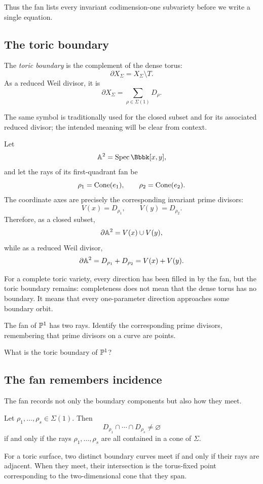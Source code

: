 Thus the fan lists every invariant codimension-one subvariety before
we write a single equation.

\subsection{The toric boundary}

\begin{definition}
The \emph{toric boundary} is the complement of the dense torus:
\[
\partial X_\Sigma
=
X_\Sigma\setminus T.
\]
As a reduced Weil divisor, it is
\[
\partial X_\Sigma
=
\sum_{\rho\in\Sigma(1)}D_\rho.
\]
\end{definition}

The same symbol is traditionally used for the closed subset and for
its associated reduced divisor; the intended meaning will be clear
from context.

\begin{example}
Let
\[
\AAA^2=\Spec\Bbbk[x,y],
\]
and let the rays of its first-quadrant fan be
\[
\rho_1=\operatorname{Cone}(e_1),
\qquad
\rho_2=\operatorname{Cone}(e_2).
\]
The coordinate axes are precisely the corresponding invariant prime
divisors:
\[
V(x)=D_{\rho_1},
\qquad
V(y)=D_{\rho_2}.
\]
Therefore, as a closed subset,
\[
\partial\mathbb{A}^2
=
V(x)\cup V(y),
\]
while as a reduced Weil divisor,
\[
\partial\mathbb{A}^2
=
D_{\rho_1}+D_{\rho_2}
=
V(x)+V(y).
\]
\end{example}

For a complete toric variety, every direction has been filled in by
the fan, but the toric boundary remains: completeness does not mean
that the dense torus has no boundary. It means that every
one-parameter direction approaches some boundary orbit.

\begin{pauseandthink}
The fan of \(\mathbb{P}^1\) has two rays. Identify the corresponding prime
divisors, remembering that prime divisors on a curve are points.

What is the toric boundary of \(\mathbb{P}^1\)?
\end{pauseandthink}

\subsection{The fan remembers incidence}

The fan records not only the boundary components but also how they
meet.

\begin{proposition}
\label{prop:boundary-incidence}
Let \(\rho_1,\ldots,\rho_s\in\Sigma(1)\). Then
\[
D_{\rho_1}\cap\cdots\cap D_{\rho_s}\neq\varnothing
\]
if and only if the rays \(\rho_1,\ldots,\rho_s\) are all contained in
a cone of \(\Sigma\).

For a toric surface, two distinct boundary curves meet if and only if
their rays are adjacent. When they meet, their intersection is the
torus-fixed point corresponding to the two-dimensional cone that they
span.
\end{proposition}

